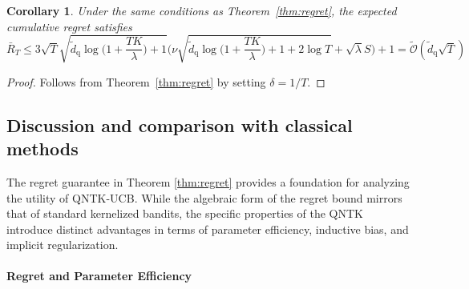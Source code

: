\documentclass[pdflatex,sn-mathphys-num]{sn-jnl}%
\theoremstyle{thmstyleone}%
\newtheorem{corollary}[theorem]{Corollary}
\theoremstyle{thmstyletwo}%
\theoremstyle{thmstylethree}%
\begin{document}


\begin{corollary}
    Under the same conditions as Theorem~\ref{thm:regret}, the expected cumulative regret satisfies $$
    \bar{R}_T \le
3\sqrt{T}\sqrt{\widetilde{d}_{\mathrm{q}}\log \Big(1+\frac{TK}{\lambda}\Big)+1}\Big(\nu\sqrt{\widetilde{d}_{\mathrm{q}}\log\!\Big(1+\frac{TK}{\lambda}\Big)+ 1 +2\log T}+\sqrt{\lambda}S\Big) +1 = \tilde{\mathcal{O}}\left(\widetilde{d}_{\mathrm{q}} \sqrt{T} \right)
    $$
\end{corollary}
\begin{proof}
    Follows from Theorem~\ref{thm:regret} by setting $\delta=1/T$.
\end{proof}
















\subsection{Discussion and comparison with classical methods} \label{sec:comparison_w_other_models}

The regret guarantee in Theorem \ref{thm:regret} provides a foundation for analyzing the utility of QNTK-UCB. While the algebraic form of the regret bound mirrors that of standard kernelized bandits, the specific properties of the QNTK introduce distinct advantages in terms of parameter efficiency, inductive bias, and implicit regularization.





\paragraph{Regret and Parameter Efficiency} 

\end{document}
